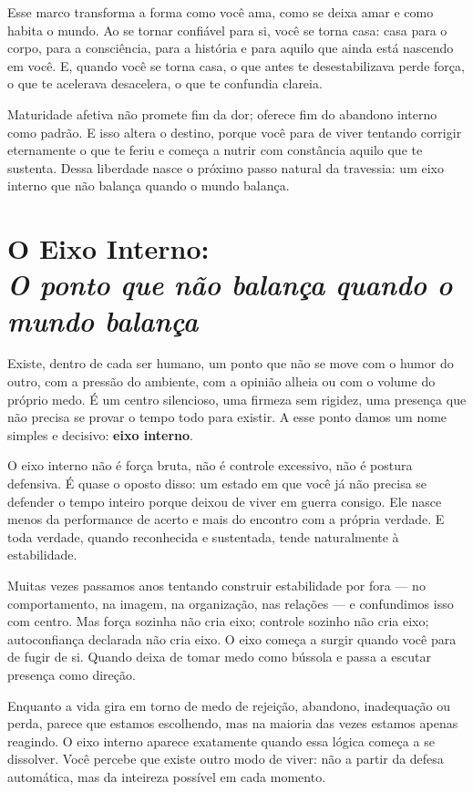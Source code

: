 \documentclass[12pt]{book}
\begin{document}
Esse marco transforma a forma como você ama, como se deixa amar e como habita o mundo. Ao se tornar confiável para si, você se torna casa: casa para o corpo, para a consciência, para a história e para aquilo que ainda está nascendo em você. E, quando você se torna casa, o que antes te desestabilizava perde força, o que te acelerava desacelera, o que te confundia clareia.

Maturidade afetiva não promete fim da dor; oferece fim do abandono interno como padrão. E isso altera o destino, porque você para de viver tentando corrigir eternamente o que te feriu e começa a nutrir com constância aquilo que te sustenta. Dessa liberdade nasce o próximo passo natural da travessia: um eixo interno que não balança quando o mundo balança.

\chapter[O Eixo Interno: O ponto que não balança quando o mundo balança]{O Eixo Interno:\\[0.4ex]\large\itshape O ponto que não balança quando o mundo balança}

Existe, dentro de cada ser humano, um ponto que não se move com o humor do outro, com a pressão do ambiente, com a opinião alheia ou com o volume do próprio medo. É um centro silencioso, uma firmeza sem rigidez, uma presença que não precisa se provar o tempo todo para existir. A esse ponto damos um nome simples e decisivo: \textbf{eixo interno}.

O eixo interno não é força bruta, não é controle excessivo, não é postura defensiva. É quase o oposto disso: um estado em que você já não precisa se defender o tempo inteiro porque deixou de viver em guerra consigo. Ele nasce menos da performance de acerto e mais do encontro com a própria verdade. E toda verdade, quando reconhecida e sustentada, tende naturalmente à estabilidade.

Muitas vezes passamos anos tentando construir estabilidade por fora — no comportamento, na imagem, na organização, nas relações — e confundimos isso com centro. Mas força sozinha não cria eixo; controle sozinho não cria eixo; autoconfiança declarada não cria eixo. O eixo começa a surgir quando você para de fugir de si. Quando deixa de tomar medo como bússola e passa a escutar presença como direção.

Enquanto a vida gira em torno de medo de rejeição, abandono, inadequação ou perda, parece que estamos escolhendo, mas na maioria das vezes estamos apenas reagindo. O eixo interno aparece exatamente quando essa lógica começa a se dissolver. Você percebe que existe outro modo de viver: não a partir da defesa automática, mas da inteireza possível em cada momento.
\end{document}
